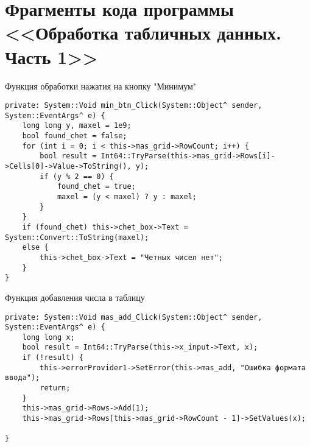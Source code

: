 \section{Фрагменты кода программы <<Обработка табличных данных. Часть 1>>}
\label{app:table_data}

Функция обработки нажатия на кнопку "Минимум"
\begin{verbatim}
private: System::Void min_btn_Click(System::Object^ sender, System::EventArgs^ e) {
	long long y, maxel = 1e9;
	bool found_chet = false;
	for (int i = 0; i < this->mas_grid->RowCount; i++) {
		bool result = Int64::TryParse(this->mas_grid->Rows[i]->Cells[0]->Value->ToString(), y);
		if (y % 2 == 0) {
			found_chet = true;
			maxel = (y < maxel) ? y : maxel;
		}
	}
	if (found_chet)	this->chet_box->Text = System::Convert::ToString(maxel);
	else {
		this->chet_box->Text = "Четных чисел нет";
	}
}
\end{verbatim}
Функция добавления числа в таблицу
\begin{verbatim}
private: System::Void mas_add_Click(System::Object^ sender, System::EventArgs^ e) {
	long long x;
	bool result = Int64::TryParse(this->x_input->Text, x);
	if (!result) {
		this->errorProvider1->SetError(this->mas_add, "Ошибка формата ввода");
		return;
	}
	this->mas_grid->Rows->Add(1);
	this->mas_grid->Rows[this->mas_grid->RowCount - 1]->SetValues(x);

}
\end{verbatim}